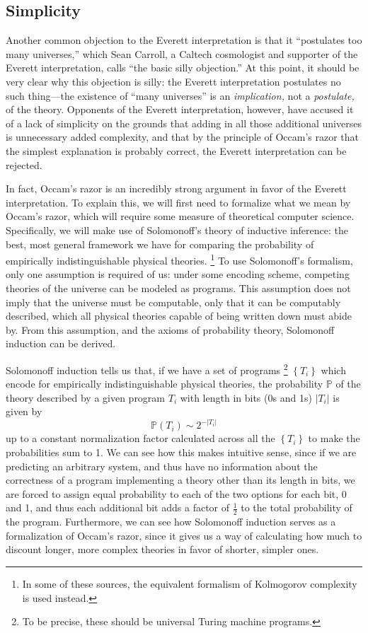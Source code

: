 \documentclass[
    12pt,
    letterpaper,
    aps,
    prd,
    longbibliography,
    twocolumn,
    nofootinbib,
    raggedbottom,
    amsmath,
    amssymb,
    amsfonts,
]{revtex4-1}
\let\origfootnote\footnote
\renewcommand{\footnote}[1]{%
   \begingroup%
   \renewcommand{\footnotesize}{\fontsize{10pt}{8pt}\selectfont}%
   \origfootnote{#1}%
   \endgroup%
}
\newcommand{\abs}[1]{\left|#1\right|}
\newcommand{\set}[1]{\left\{#1\right\}}
\newcommand{\mbb}[1]{\mathbb{#1}}
\begin{document}
\subsection{Simplicity}
\label{sec:simp}

Another common objection to the Everett interpretation is that it ``postulates too many universes,'' which Sean Carroll, a Caltech cosmologist and supporter of the Everett interpretation, calls ``the basic silly objection.''\cite{carroll} At this point, it should be very clear why this objection is silly: the Everett interpretation postulates no such thing---the existence of ``many universes'' is an \textit{implication,} not a \textit{postulate,} of the theory. Opponents of the Everett interpretation, however, have accused it of a lack of simplicity on the grounds that adding in all those additional universes is unnecessary added complexity, and that by the principle of Occam's razor that the simplest explanation is probably correct, the Everett interpretation can be rejected.\cite{badoccam}

In fact, Occam's razor is an incredibly strong argument in favor of the Everett interpretation. To explain this, we will first need to formalize what we mean by Occam's razor, which will require some measure of theoretical computer science. Specifically, we will make use of Solomonoff's theory of inductive inference: the best, most general framework we have for comparing the probability of empirically indistinguishable physical theories.\cite{solomonoff}\cite{occam}\cite{lesswrongsolomonoff}\footnote{In some of these sources, the equivalent formalism of Kolmogorov complexity is used instead.} To use Solomonoff's formalism, only one assumption is required of us: under some encoding scheme, competing theories of the universe can be modeled as programs. This assumption does not imply that the universe must be computable, only that it can be computably described, which all physical theories capable of being written down must abide by. From this assumption, and the axioms of probability theory, Solomonoff induction can be derived.\cite{solomonoff}

Solomonoff induction tells us that, if we have a set of programs\footnote{To be precise, these should be universal Turing machine programs.} $\set{T_i}$ which encode for empirically indistinguishable physical theories, the probability $\mbb P$ of the theory described by a given program $T_i$ with length in bits (0s and 1s) $\abs{T_i}$ is given by
\[
    \mbb P(T_i) \sim 2^{-\abs{T_i}}
\]
up to a constant normalization factor calculated across all the $\set{T_i}$ to make the probabilities sum to 1.\cite{solomonoff} We can see how this makes intuitive sense, since if we are predicting an arbitrary system, and thus have no information about the correctness of a program implementing a theory other than its length in bits, we are forced to assign equal probability to each of the two options for each bit, 0 and 1, and thus each additional bit adds a factor of $\frac{1}{2}$ to the total probability of the program. Furthermore, we can see how Solomonoff induction serves as a formalization of Occam's razor, since it gives us a way of calculating how much to discount longer, more complex theories in favor of shorter, simpler ones.
\end{document}
